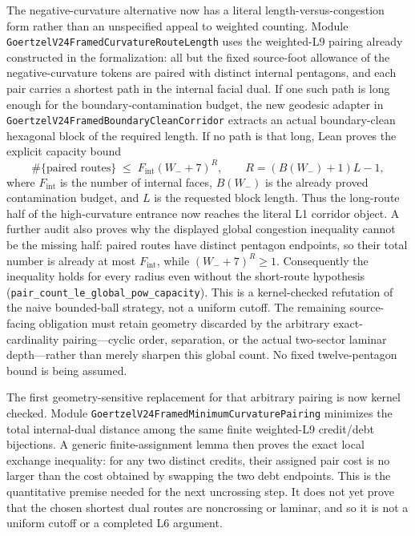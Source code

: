 \documentclass[11pt]{article}
\theoremstyle{definition}
\begin{document}
The negative-curvature alternative now has a literal length-versus-congestion
form rather than an unspecified appeal to weighted counting.  Module
\texttt{GoertzelV24FramedCurvatureRouteLength} uses the weighted-L9 pairing
already constructed in the formalization: all but the fixed source-foot
allowance of the negative-curvature tokens are paired with distinct internal
pentagons, and each pair carries a shortest path in the internal facial dual.
If one such path is long enough for the boundary-contamination budget, the new
geodesic adapter in
\texttt{GoertzelV24FramedBoundaryCleanCorridor} extracts an actual
boundary-clean hexagonal block of the required length.  If no path is that
long, Lean proves the explicit capacity bound
\[
  \#\{\text{paired routes}\}
  \;\leq\;
  F_{\mathrm{int}}(W_-+7)^R,
  \qquad
  R=(B(W_-)+1)L-1,
\]
where $F_{\mathrm{int}}$ is the number of internal faces, $B(W_-)$ is the
already proved contamination budget, and $L$ is the requested block length.
Thus the long-route half of the high-curvature entrance now reaches the
literal L1 corridor object.  A further audit also proves why the displayed
global congestion inequality cannot be the missing half: paired routes have
distinct pentagon endpoints, so their total number is already at most
$F_{\mathrm{int}}$, while $(W_-+7)^R\geq1$.  Consequently the inequality holds
for every radius even without the short-route hypothesis
(\texttt{pair\_count\_le\_global\_pow\_capacity}).  This is a
kernel-checked refutation of the naive bounded-ball strategy, not a uniform
cutoff.  The remaining source-facing obligation must retain geometry discarded
by the arbitrary exact-cardinality pairing---cyclic order, separation, or the
actual two-sector laminar depth---rather than merely sharpen this global
count.  No fixed twelve-pentagon bound is being assumed.

The first geometry-sensitive replacement for that arbitrary pairing is now
kernel checked.  Module
\texttt{GoertzelV24FramedMinimumCurvaturePairing} minimizes the total
internal-dual distance among the same finite weighted-L9 credit/debt
bijections.  A generic finite-assignment lemma then proves the exact local
exchange inequality: for any two distinct credits, their assigned pair cost
is no larger than the cost obtained by swapping the two debt endpoints.  This
is the quantitative premise needed for the next uncrossing step.  It does not
yet prove that the chosen shortest dual routes are noncrossing or laminar, and
so it is not a uniform cutoff or a completed L6 argument.
\end{document}
